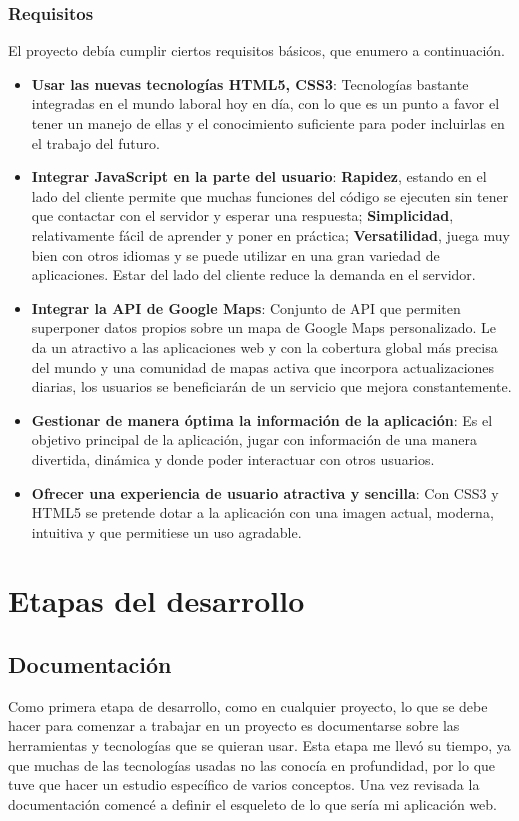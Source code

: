 \subsubsection{Requisitos}
El proyecto deb\'ia cumplir ciertos requisitos b\'asicos, que enumero a continuaci\'on.

\begin{itemize}
	\item \textbf{Usar las nuevas tecnolog\'ias HTML5, CSS3}: Tecnolog\'ias bastante integradas en el mundo laboral hoy en d\'ia, con lo que es un punto a favor el tener un manejo de ellas y el conocimiento suficiente para poder incluirlas en el trabajo del futuro.
	\item \textbf{Integrar JavaScript en la parte del usuario}: \textbf{Rapidez}, estando en el lado del cliente permite que muchas funciones del c\'odigo se ejecuten sin tener que contactar con el servidor y esperar una respuesta; \textbf{Simplicidad}, relativamente f\'acil de aprender y poner en pr\'actica; \textbf{Versatilidad}, juega muy bien con otros idiomas y se puede utilizar en una gran variedad de aplicaciones. Estar del lado del cliente reduce la demanda en el servidor.
	\item \textbf{Integrar la API de Google Maps}: Conjunto de API que permiten superponer datos propios sobre un mapa de Google Maps personalizado. Le da un atractivo a las aplicaciones web  y con la cobertura global m\'as precisa del mundo y una comunidad de mapas activa que incorpora actualizaciones diarias, los usuarios se beneficiar\'an de un servicio que mejora constantemente.
	\item \textbf{Gestionar de manera \'optima la informaci\'on de la aplicaci\'on}: Es el objetivo principal de la aplicaci\'on, jugar con informaci\'on de una manera divertida, din\'amica y donde poder interactuar con otros usuarios.
	\item \textbf{Ofrecer una experiencia de usuario atractiva y sencilla}: Con CSS3 y HTML5 se pretende dotar a la aplicaci\'on con una imagen actual, moderna, intuitiva y que permitiese un uso agradable.
\end{itemize}

\section{Etapas del desarrollo}
\subsection{Documentaci\'on}
Como primera etapa de desarrollo, como en cualquier proyecto, lo que se debe hacer para comenzar a trabajar en un proyecto es documentarse sobre las herramientas y tecnolog\'ias que se quieran usar. Esta etapa me llev\'o su tiempo, ya que muchas de las tecnolog\'ias usadas no las conoc\'ia en profundidad, por lo que tuve que hacer un estudio espec\'ifico de varios conceptos. Una vez revisada la documentaci\'on comenc\'e a definir el esqueleto de lo que ser\'ia mi aplicaci\'on web.\\

